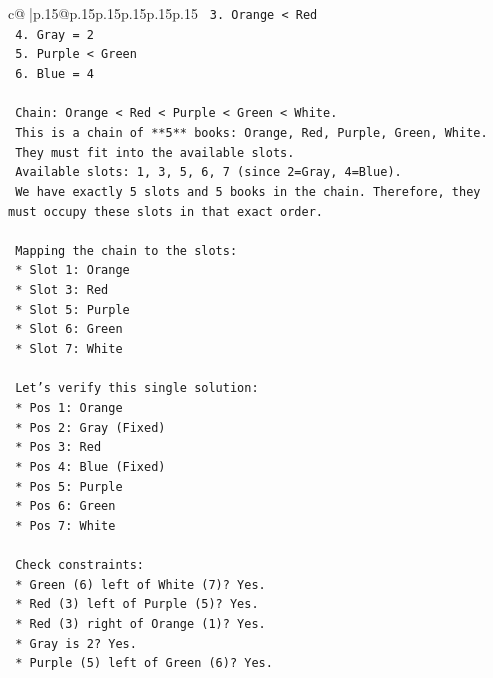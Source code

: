 \documentclass{article}
\begin{document}
{\begin{supertabular}{c@{$\;$}|p{.15\linewidth}@{}p{.15\linewidth}p{.15\linewidth}p{.15\linewidth}p{.15\linewidth}p{.15\linewidth}}
{{{\texttt{    3. Orange < Red} \\
\texttt{    4. Gray = 2} \\
\texttt{    5. Purple < Green} \\
\texttt{    6. Blue = 4} \\
\\ 
\texttt{    Chain: Orange < Red < Purple < Green < White.} \\
\texttt{    This is a chain of **5** books: Orange, Red, Purple, Green, White.} \\
\texttt{    They must fit into the available slots.} \\
\texttt{    Available slots: 1, 3, 5, 6, 7 (since 2=Gray, 4=Blue).} \\
\texttt{    We have exactly 5 slots and 5 books in the chain. Therefore, they must occupy these slots in that exact order.} \\
\\ 
\texttt{    Mapping the chain to the slots:} \\
\texttt{    *   Slot 1: Orange} \\
\texttt{    *   Slot 3: Red} \\
\texttt{    *   Slot 5: Purple} \\
\texttt{    *   Slot 6: Green} \\
\texttt{    *   Slot 7: White} \\
\\ 
\texttt{    Let's verify this single solution:} \\
\texttt{    *   Pos 1: Orange} \\
\texttt{    *   Pos 2: Gray (Fixed)} \\
\texttt{    *   Pos 3: Red} \\
\texttt{    *   Pos 4: Blue (Fixed)} \\
\texttt{    *   Pos 5: Purple} \\
\texttt{    *   Pos 6: Green} \\
\texttt{    *   Pos 7: White} \\
\\ 
\texttt{    Check constraints:} \\
\texttt{    *   Green (6) left of White (7)? Yes.} \\
\texttt{    *   Red (3) left of Purple (5)? Yes.} \\
\texttt{    *   Red (3) right of Orange (1)? Yes.} \\
\texttt{    *   Gray is 2? Yes.} \\
\texttt{    *   Purple (5) left of Green (6)? Yes.} \\
}}}
\end{supertabular}}
\end{document}
